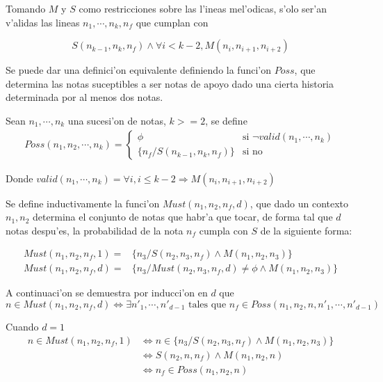 Tomando $M$ y $S$ como restricciones sobre las l'ineas mel'odicas, s'olo ser'an v'alidas las lineas $n_1, \cdots, n_k, n_f$ que cumplan con

$$  S(n_{k-1}, n_k, n_f) \land \forall i<k-2, M(n_i, n_{i+1}, n_{i+2})$$

Se puede dar una definici'on equivalente definiendo la funci'on $Poss$, que determina las notas suceptibles a ser notas de apoyo dado una cierta historia determinada por al menos dos notas.

\begin{definition}
\label{def:poss}
Sean $n_1, \cdots, n_k$ una sucesi'on de notas, $k>=2$, se define
\begin{align*}
Poss(n_1, n_2, \cdots, n_k)= \left\{
 \begin{array}{rl}
  \phi & \text{si } \neg valid(n_1, \cdots, n_k) \\ %
   \{n_f / S(n_{k-1}, n_k, n_f)\} & \text{si no}
 \end{array} \right.
\end{align*}

Donde $valid(n_1, \cdots, n_k) = \forall i, i\leq k-2 \Rightarrow M(n_i, n_{i+1}, n_{i+2})$
\end{definition}

Se define inductivamente la funci'on $Must(n_1, n_2, n_f, d)$, que dado un contexto $n_1, n_2$ determina el conjunto de notas que habr'a que tocar, de forma tal
que $d$ notas despu'es, la probabilidad de la nota $n_f$ cumpla con $S$ de la siguiente forma:
\begin{definition}
\label{def:must}
\begin{align*}
Must(n_1, n_2, n_f, 1)=& \{n_3/ S(n_2, n_3, n_f) \land M(n_1, n_2, n_3)\}\\
Must(n_1, n_2, n_f, d)=& \{n_3/ Must(n_2, n_3, n_f, d) \neq \phi \land M(n_1,n_2, n_3)\}
\end{align*}
\end{definition}


A continuaci'on se demuestra por inducci'on en $d$ que 
$$n \in Must(n_1, n_2, n_f, d) \Leftrightarrow \exists n'_1, \cdots, n'_{d-1} \text{ tales que } n_f \in Poss(n_1, n_2, n, n'_1, \cdots, n'_{d-1})$$

Cuando $d=1$
\begin{align*}
n \in Must(n_1, n_2, n_f, 1)   & \Leftrightarrow n \in \{n_3/ S(n_2, n_3, n_f) \land M(n_1, n_2, n_3)\} \\
                               & \Leftrightarrow S(n_2, n, n_f) \land M(n_1, n_2, n)   \\
                               & \Leftrightarrow n_f \in Poss(n_1, n_2, n)
\end{align*}

